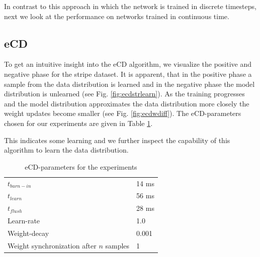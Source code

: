 In contrast to this approach in which the network is trained in discrete timesteps, next we look at the performance on networks trained in continuous time.  

\subsection{eCD} \label{c:ecdexp}

To get an intuitive insight into the eCD algorithm, we visualize the positive and negative phase for the stripe dataset.
It is apparent, that in the positive phase a sample from the data distribution is learned and in the negative phase the model distribution is unlearned (see Fig. \ref{fig:ecdstrlearn}).
As the training progresses and the model distribution approximates the data distribution more closely the weight updates become smaller (see Fig. \ref{fig:ecdwdiff}). 
The eCD-parameters chosen for our experiments are given in Table \ref{tab:ecdrunparam}.

This indicates some learning and we further inspect the capability of this algorithm to learn the data distribution.

\begin{table}[]
\caption{eCD-parameters for the experiments}
\centering
\label{tab:ecdrunparam}
\begin{tabular}{|ll|}
\hline
$t_{burn-in}$    	& 14 ms 		    \\
$t_{learn}$    		& 56 ms 		     \\
$t_{flush}$    		& 28 ms		             \\
Learn-rate     		& 1.0 		                 \\
Weight-decay    	& 0.001		              \\
Weight synchronization after $n$ samples     	& 1		              \\\hline
\end{tabular}
\end{table}


